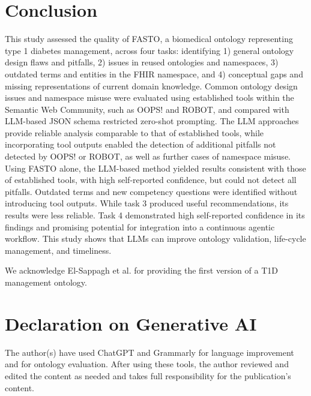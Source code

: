 \documentclass[
]{ceurart}
\begin{document}
\section{Conclusion}
\label{sec:conclusion}

This study assessed the quality of FASTO, a biomedical ontology representing type 1 diabetes management, across four tasks: identifying 1) general ontology design flaws and pitfalls, 2) issues in reused ontologies and namespaces, 3) outdated terms and entities in the FHIR namespace, and 4) conceptual gaps and missing representations of current domain knowledge. Common ontology design issues and namespace misuse were evaluated using established tools within the Semantic Web Community, such as OOPS! and ROBOT, and compared with LLM-based JSON schema restricted zero-shot prompting. The LLM approaches provide reliable analysis comparable to that of established tools, while incorporating tool outputs enabled the detection of additional pitfalls not detected by OOPS! or ROBOT, as well as further cases of namespace misuse. Using FASTO alone, the LLM-based method yielded results consistent with those of established tools, with high self-reported confidence, but could not detect all pitfalls. Outdated terms and new competency questions were identified without introducing tool outputs. While task 3 produced useful recommendations, its results were less reliable. Task 4 demonstrated high self-reported confidence in its findings and promising potential for integration into a continuous agentic workflow. This study shows that LLMs can improve ontology validation, life-cycle management, and timeliness.

\begin{acknowledgments}
  We acknowledge El-Sappagh et al. for providing the first version of a T1D management ontology. 
\end{acknowledgments}

\section*{Declaration on Generative AI}

The author(s) have used ChatGPT and Grammarly for language improvement and for ontology evaluation. After using these tools, the author reviewed and edited the content as needed and takes full responsibility for the publication’s content.
\newline

\newpage


\end{document}
